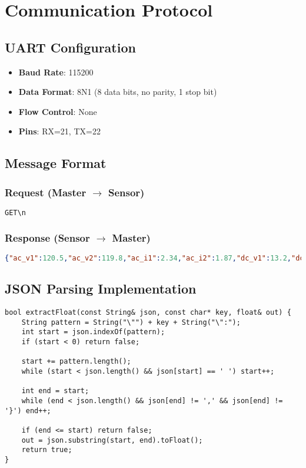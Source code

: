 \documentclass[11pt,a4paper]{article}
\begin{document}
\section{Communication Protocol}

\subsection{UART Configuration}
\begin{itemize}
    \item \textbf{Baud Rate}: 115200
    \item \textbf{Data Format}: 8N1 (8 data bits, no parity, 1 stop bit)
    \item \textbf{Flow Control}: None
    \item \textbf{Pins}: RX=21, TX=22
\end{itemize}

\subsection{Message Format}

\subsubsection{Request (Master $\rightarrow$ Sensor)}
\begin{lstlisting}[language=bash]
GET\n
\end{lstlisting}

\subsubsection{Response (Sensor $\rightarrow$ Master)}
\begin{lstlisting}[language=json]
{"ac_v1":120.5,"ac_v2":119.8,"ac_i1":2.34,"ac_i2":1.87,"dc_v1":13.2,"dc_v2":12.8,"dc_i":5.6}
\end{lstlisting}

\subsection{JSON Parsing Implementation}

\begin{lstlisting}[caption=JSON Parsing Implementation]
bool extractFloat(const String& json, const char* key, float& out) {
    String pattern = String("\"") + key + String("\":");
    int start = json.indexOf(pattern);
    if (start < 0) return false;
    
    start += pattern.length();
    while (start < json.length() && json[start] == ' ') start++;
    
    int end = start;
    while (end < json.length() && json[end] != ',' && json[end] != '}') end++;
    
    if (end <= start) return false;
    out = json.substring(start, end).toFloat();
    return true;
}
\end{lstlisting}
\end{document}
